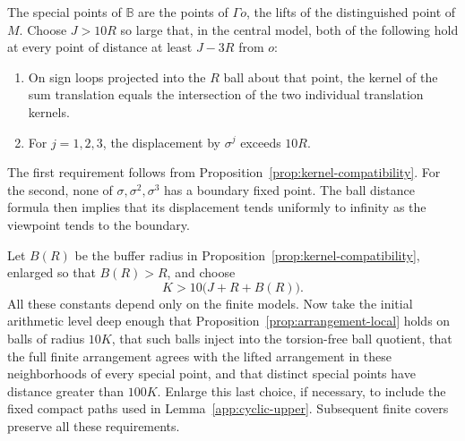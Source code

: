 \documentclass[11pt,reqno]{amsart}
\numberwithin{equation}{section}
\theoremstyle{definition}
\theoremstyle{remark}
\begin{document}
The special points of $\mathbb B$ are the points of $\Gamma o$, the lifts
of the distinguished point of $M$.  Choose $J>10R$ so large that, in
the central model, both of the following hold at every point of
distance at least $J-3R$ from $o$:
\begin{enumerate}
\item On sign loops projected into the $R$ ball about that point, the
kernel of the sum translation equals the intersection of the two
individual translation kernels.
\item For $j=1,2,3$, the displacement by $\sigma^j$ exceeds $10R$.
\end{enumerate}
The first requirement follows from
Proposition~\ref{prop:kernel-compatibility}.  For the second, none of
$\sigma,\sigma^2,\sigma^3$ has a boundary fixed point.  The ball
distance formula then implies that its displacement tends uniformly
to infinity as the viewpoint tends to the boundary.

Let $B(R)$ be the buffer radius in
Proposition~\ref{prop:kernel-compatibility}, enlarged so that
$B(R)>R$, and choose
\begin{equation}\label{app:chart-radius}
 K>10\bigl(J+R+B(R)\bigr).
\end{equation}
All these constants depend only on the finite models.  Now take the
initial arithmetic level deep enough that
Proposition~\ref{prop:arrangement-local} holds on balls of radius
$10K$, that such balls inject into the torsion-free ball quotient,
that the full finite arrangement agrees with the lifted arrangement
in these neighborhoods of every special point, and that distinct
special points have distance greater than $100K$.  Enlarge this last
choice, if necessary, to include the fixed compact paths used in
Lemma~\ref{app:cyclic-upper}.  Subsequent finite covers preserve all
these requirements.
\end{document}
